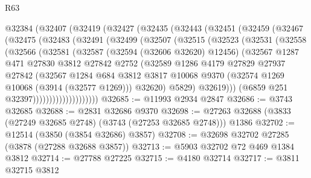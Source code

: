 \begin{lexlean}{R63}
\begin{coremodule}
    @32384
      (@32407
        (@32419
          (@32427
            (@32435
              (@32443
                (@32451
                  (@32459
                    (@32467
                      (@32475
                        (@32483
                          (@32491
                            (@32499
                              (@32507
                                (@32515
                                  (@32523
                                    (@32531
                                      (@32558
                                        (@32566
                                          (@32581
                                            (@32587
                                              (@32594 (@32606 @32620) @12456)
                                              (@32567
                                                @1287
                                                @471
                                                @27830
                                                @3812
                                                @27842
                                                @2752
                                                (@32589
                                                  @1286
                                                  @4179
                                                  @27829
                                                  @27937
                                                  @27842
                                                  (@32567
                                                    @1284
                                                    @684
                                                    @3812
                                                    @3817
                                                    @10068
                                                    @9370
                                                    (@32574 @1269 @10068 (@3914 (@32577 @1269)))
                                                    @32620)
                                                  @5829)
                                                @32619)))
                                          (@6859 @251 @32397))))))))))))))))))))
@32685 := @11993 @2934 @2847
@32686 := @3743 @32685
@32688 := @2831 @32686 @9370
@32698 := @27263 @32688 (@3833 (@27249 @32685 @2748) (@3743 (@27253 @32685 @2748))) @1386
@32702 := @12514 (@3850 (@3854 @32686) @3857)
@32708 := @32698 @32702 @27285 (@3878 (@27288 @32688 @3857))
@32713 := @5903 @32702 @72 @469 @1384 @3812
@32714 := @27788 @27225
@32715 := @4180 @32714
@32717 := @3811 @32715 @3812

\end{coremodule}
\end{lexlean}
